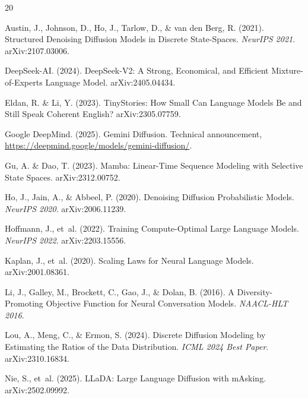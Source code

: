 \documentclass[11pt,a4paper]{article}
\begin{document}
\begin{thebibliography}{20}

Austin, J., Johnson, D., Ho, J., Tarlow, D., \& van den Berg, R. (2021).
\newblock Structured Denoising Diffusion Models in Discrete State-Spaces.
\newblock \textit{NeurIPS 2021}. arXiv:2107.03006.

DeepSeek-AI. (2024).
\newblock DeepSeek-V2: A Strong, Economical, and Efficient Mixture-of-Experts Language Model.
\newblock arXiv:2405.04434.

Eldan, R. \& Li, Y. (2023).
\newblock TinyStories: How Small Can Language Models Be and Still Speak Coherent English?
\newblock arXiv:2305.07759.

Google DeepMind. (2025).
\newblock Gemini Diffusion.
\newblock Technical announcement, \url{https://deepmind.google/models/gemini-diffusion/}.

Gu, A. \& Dao, T. (2023).
\newblock Mamba: Linear-Time Sequence Modeling with Selective State Spaces.
\newblock arXiv:2312.00752.

Ho, J., Jain, A., \& Abbeel, P. (2020).
\newblock Denoising Diffusion Probabilistic Models.
\newblock \textit{NeurIPS 2020}. arXiv:2006.11239.

Hoffmann, J., et~al. (2022).
\newblock Training Compute-Optimal Large Language Models.
\newblock \textit{NeurIPS 2022}. arXiv:2203.15556.

Kaplan, J., et~al. (2020).
\newblock Scaling Laws for Neural Language Models.
\newblock arXiv:2001.08361.

Li, J., Galley, M., Brockett, C., Gao, J., \& Dolan, B. (2016).
\newblock A Diversity-Promoting Objective Function for Neural Conversation Models.
\newblock \textit{NAACL-HLT 2016}.

Lou, A., Meng, C., \& Ermon, S. (2024).
\newblock Discrete Diffusion Modeling by Estimating the Ratios of the Data Distribution.
\newblock \textit{ICML 2024 Best Paper}. arXiv:2310.16834.

Nie, S., et~al. (2025).
\newblock LLaDA: Large Language Diffusion with mAsking.
\newblock arXiv:2502.09992.


\end{thebibliography}
\end{document}
